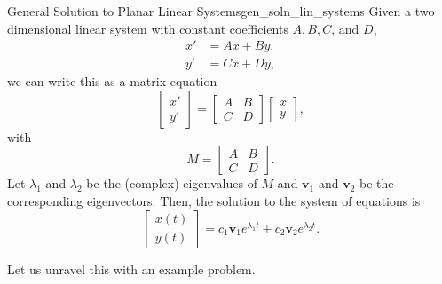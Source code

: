         \begin{prop}{General Solution to Planar Linear Systems}{gen_soln_lin_systems}
        Given a two dimensional linear system with constant coefficients $A,B,C$, and $D$,
        \begin{align*}
        x' &= Ax+By,\\
        y' &= Cx+Dy,
        \end{align*}
        we can write this as a matrix equation
        \[
        \begin{bmatrix} x' \\ y' \end{bmatrix} = \begin{bmatrix} A & B\\ C & D \end{bmatrix} \begin{bmatrix} x \\ y \end{bmatrix},
        \]
        with
        \[
        M=\begin{bmatrix} A & B \\ C & D \end{bmatrix}.
        \]
        Let $\lambda_1$ and $\lambda_2$ be the (complex) eigenvalues of $M$ and $\mathbf{v}_1$ and $\mathbf{v}_2$ be the corresponding eigenvectors.  Then, the solution to the system of equations is
        \[
        \begin{bmatrix} x(t) \\ y(t) \end{bmatrix} = c_1 \mathbf{v}_1 e^{\lambda_1t} + c_2 \mathbf{v}_2e^{\lambda_2 t}.
        \]
        \end{prop}
        
        Let us unravel this with an example problem.
        
